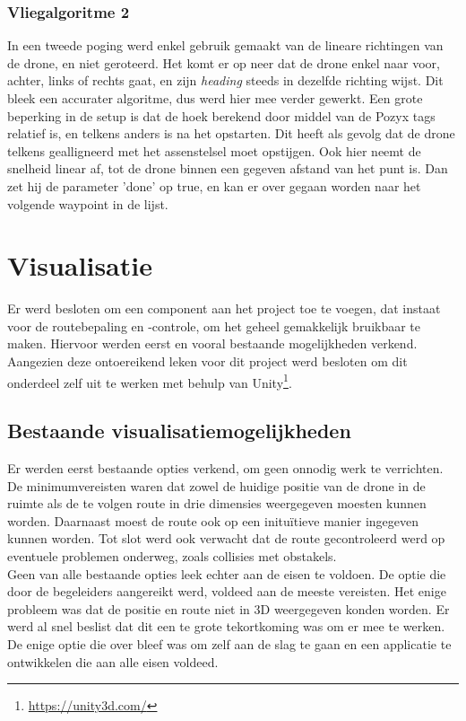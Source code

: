 \subsubsection{Vliegalgoritme 2}
In een tweede poging werd enkel gebruik gemaakt van de lineare richtingen van de drone, en niet geroteerd.
Het komt er op neer dat de drone enkel naar voor, achter, links of rechts gaat, en zijn \textit{heading} steeds in dezelfde richting wijst.
Dit bleek een accurater algoritme, dus werd hier mee verder gewerkt. Een grote beperking in de setup is dat de hoek berekend door middel van de Pozyx tags relatief is, en telkens anders is na het opstarten.
Dit heeft als gevolg dat de drone telkens gealligneerd met het assenstelsel moet opstijgen.
Ook hier neemt de snelheid linear af, tot de drone binnen een gegeven afstand van het punt is.
Dan zet hij de parameter ’done’ op true, en kan er over gegaan worden naar het volgende waypoint in de lijst.

\section{Visualisatie} \label{sec:visualization}
Er werd besloten om een component aan het project toe te voegen, dat instaat voor de routebepaling en -controle, om het geheel gemakkelijk bruikbaar te maken.
Hiervoor werden eerst en vooral bestaande mogelijkheden verkend.
Aangezien deze ontoereikend leken voor dit project werd besloten om dit onderdeel zelf uit te werken met behulp van Unity\footnote{\url{https://unity3d.com/}}.

\subsection{Bestaande visualisatiemogelijkheden} \label{sec:opties}
Er werden eerst bestaande opties verkend, om geen onnodig werk te verrichten.
De minimumvereisten waren dat zowel de huidige positie van de drone in de ruimte als de te volgen route in drie dimensies weergegeven moesten kunnen worden.
Daarnaast moest de route ook op een inituïtieve manier ingegeven kunnen worden.
Tot slot werd ook verwacht dat de route gecontroleerd werd op eventuele problemen onderweg, zoals collisies met obstakels.\\

Geen van alle bestaande opties leek echter aan de eisen te voldoen.
De optie die door de begeleiders aangereikt werd, voldeed aan de meeste vereisten.
Het enige probleem was dat de positie en route niet in 3D weergegeven konden worden.
Er werd al snel beslist dat dit een te grote tekortkoming was om er mee te werken.
De enige optie die over bleef was om zelf aan de slag te gaan en een applicatie te ontwikkelen die aan alle eisen voldeed.

